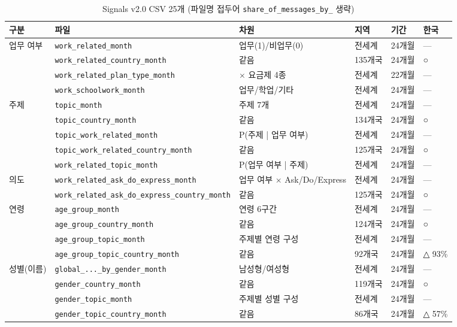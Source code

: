 \documentclass[11pt]{article}
\begin{document}
\begin{longtable}{L{1.8cm}L{4.4cm}L{3.0cm}L{2.2cm}L{1.9cm}L{1.3cm}}
\caption{Signals v2.0 CSV 25개 (파일명 접두어 \texttt{share\_of\_messages\_by\_} 생략)}\label{tab:files}\\
\toprule
구분 & 파일 & 차원 & 지역 & 기간 & 한국 \\
\midrule
\endhead
업무 여부 & \texttt{work\_related\_month} & 업무(1)/비업무(0) & 전세계 & 24개월 & --- \\
 & \texttt{work\_related\_country\_month} & 같음 & 135개국 & 24개월 & ○ \\
 & \texttt{work\_related\_plan\_type\_month} & $\times$ 요금제 4종 & 전세계 & 22개월 & --- \\
 & \texttt{work\_schoolwork\_month} & 업무/학업/기타 & 전세계 & 24개월 & --- \\
주제 & \texttt{topic\_month} & 주제 7개 & 전세계 & 24개월 & --- \\
 & \texttt{topic\_country\_month} & 같음 & 134개국 & 24개월 & ○ \\
 & \texttt{topic\_work\_related\_month} & P(주제 | 업무 여부) & 전세계 & 24개월 & --- \\
 & \texttt{topic\_work\_related\_country\_month} & 같음 & 125개국 & 24개월 & ○ \\
 & \texttt{work\_related\_topic\_month} & P(업무 여부 | 주제) & 전세계 & 24개월 & --- \\
의도 & \texttt{work\_related\_ask\_do\_express\_month} & 업무 여부 $\times$ Ask/Do/Express & 전세계 & 24개월 & --- \\
 & \texttt{work\_related\_ask\_do\_express\_country\_month} & 같음 & 125개국 & 24개월 & ○ \\
연령 & \texttt{age\_group\_month} & 연령 6구간 & 전세계 & 24개월 & --- \\
 & \texttt{age\_group\_country\_month} & 같음 & 124개국 & 24개월 & ○ \\
 & \texttt{age\_group\_topic\_month} & 주제별 연령 구성 & 전세계 & 24개월 & --- \\
 & \texttt{age\_group\_topic\_country\_month} & 같음 & 92개국 & 24개월 & △ 93\% \\
성별(이름) & \texttt{global\_...\_by\_gender\_month} & 남성형/여성형 & 전세계 & 24개월 & --- \\
 & \texttt{gender\_country\_month} & 같음 & 119개국 & 24개월 & ○ \\
 & \texttt{gender\_topic\_month} & 주제별 성별 구성 & 전세계 & 24개월 & --- \\
 & \texttt{gender\_topic\_country\_month} & 같음 & 86개국 & 24개월 & △ 57\% \\

\end{longtable}
\end{document}
